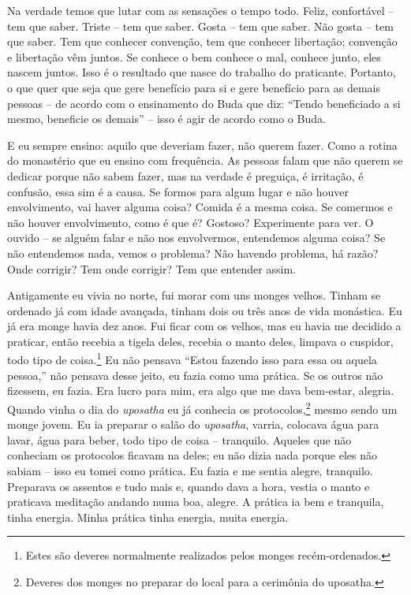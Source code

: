 Na verdade temos que lutar com as sensações o tempo todo. Feliz,
confortável – tem que saber. Triste – tem que saber. Gosta – tem que
saber. Não gosta – tem que saber. Tem que conhecer convenção, tem que
conhecer libertação; convenção e libertação vêm juntos. Se conhece o
bem conhece o mal, conhece junto, eles nascem juntos. Isso é o
resultado que nasce do trabalho do praticante. Portanto, o que quer que
seja que gere benefício para si e gere benefício para as demais pessoas
– de acordo com o ensinamento do Buda que diz: “Tendo beneficiado a si
mesmo, beneficie os demais” – isso é agir de acordo como o Buda. 

E eu sempre ensino: aquilo que deveriam fazer, não querem fazer.
Como a rotina do monastério que eu ensino com frequência. As pessoas
falam que não querem se dedicar porque não sabem fazer, mas na verdade
é preguiça, é irritação, é confusão, essa sim é a causa. Se formos para
algum lugar e não houver envolvimento, vai haver alguma coisa? Comida é
a mesma coisa. Se comermos e não houver envolvimento, como é que é?
Gostoso? Experimente para ver. O ouvido – se alguém falar e não nos
envolvermos, entendemos alguma coisa? Se não entendemos nada, vemos o
problema? Não havendo problema, há razão? Onde corrigir? Tem onde
corrigir? Tem que entender assim. 

Antigamente eu vivia no norte, fui morar com uns monges velhos.
Tinham se ordenado já com idade avançada, tinham dois ou três anos de
vida monástica. Eu já era monge havia dez anos. Fui ficar com os
velhos, mas eu havia me decidido a praticar, então recebia a tigela
deles, recebia o manto deles, limpava o cuspidor, todo tipo de
coisa.\footnote{Estes são deveres normalmente realizados pelos monges
recém-ordenados.} Eu não pensava “Estou fazendo isso para essa ou
aquela pessoa,” não pensava desse jeito, eu fazia como uma prática. Se
os outros não fizessem, eu fazia. Era lucro para mim, era algo que me
dava bem-estar, alegria. Quando vinha o dia do \textit{uposatha} eu já
conhecia os protocolos,\footnote{Deveres dos monges no preparar do local
para a cerimônia do uposatha.} mesmo sendo um monge jovem. Eu ia
preparar o salão do \textit{uposatha}, varria, colocava água para
lavar, água para beber, todo tipo de coisa – tranquilo. Aqueles que não
conheciam os protocolos ficavam na deles; eu não dizia nada porque eles
não sabiam – isso eu tomei como prática. Eu fazia e me sentia alegre,
tranquilo. Preparava os assentos e tudo mais e, quando dava a hora,
vestia o manto e praticava meditação andando numa boa, alegre. A
prática ia bem e tranquila, tinha energia. Minha prática tinha energia,
muita energia. 

